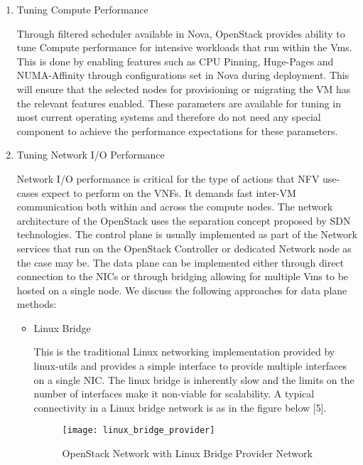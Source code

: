 \begin{enumerate}

\item Tuning Compute Performance

\begin{flushleft}
Through filtered scheduler available in Nova, OpenStack provides ability to tune Compute performance for intensive workloads that run within the Vms. This is done by enabling features such as CPU Pinning, Huge-Pages and NUMA-Affinity through configurations set in Nova during deployment. This will ensure that the selected nodes for provisioning or migrating the VM has the relevant features enabled. These parameters are available for tuning in most current operating systems and therefore do not need any special component to achieve the performance expectations for these parameters.
\end{flushleft}

\item Tuning Network I/O Performance

\begin{flushleft}
Network I/O performance is critical for the type of actions that NFV use-cases expect to perform on the VNFs. It demands fast inter-VM communication both within and across the compute nodes. 
The network architecture of the OpenStack uses the separation concept proposed by SDN technologies. The control plane is usually implemented as part of the Network services that run on the OpenStack Controller or dedicated Network node as the case may be. The data plane can be implemented either through direct connection to the NICs or through bridging allowing for multiple Vms to be hosted on a single node. We discuss the following approaches for data plane methods:
\end{flushleft}
		
    \begin{itemize}
        \item Linux Bridge
            \begin{flushleft}
            This is the traditional Linux networking implementation provided by linux-utils and provides a simple interface to provide multiple interfaces on a single NIC. The linux bridge is inherently slow and the limits on the number of interfaces make it non-viable for scalability. A typical connectivity in a Linux bridge network is as in the figure below [5].
            \end{flushleft}
            
            \begin{figure}
		\centering
		\texttt{[image: linux\_bridge\_provider]}
		\label{fig:figure15}
		\caption{OpenStack Network with Linux Bridge Provider Network}
	    \end{figure}
				

\end{itemize}
\end{enumerate}
